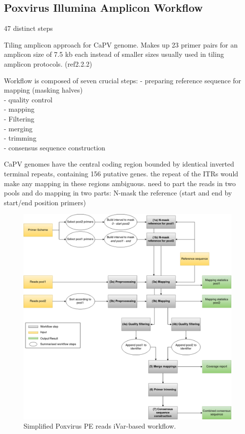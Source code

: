 \subsection{Poxvirus Illumina Amplicon Workflow}
47 distinct steps

Tiling amplicon approach for CaPV genome. Makes up 23 primer pairs for an amplicon size of 7.5 kb each instead of smaller sizes usually used in tiling amplicon protocols. (ref2.2.2)

Workflow is composed of seven crucial steps:
- preparing reference sequence for mapping (masking halves) \\
- quality control\\
- mapping\\
- Filtering\\
- merging\\
- trimming\\
- consensus sequence construction

CaPV genomes have the central coding region bounded by identical inverted terminal repeats,
containing 156 putative genes. the repeat of the ITRs would make any mapping in these regions ambiguous.
need to part the reads in two pools and do mapping in two parts: N-mask the reference (start and end by start/end position primers)

\begin{figure}[ht!]
	\includegraphics[width=1\textwidth]{media/pox.png}
	\caption{Simplified Poxvirus PE reads iVar-based workflow.}
	\label{fig:3-pox-wf}
\end{figure}

